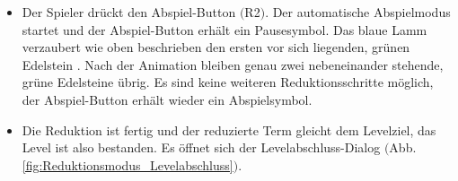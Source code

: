 \begin{itemize}
\begin{itemize}
\item Der Spieler drückt den Abspiel-Button $($R2$)$. Der automatische Abspielmodus startet und der Abspiel-Button erhält ein Pausesymbol. Das blaue Lamm verzaubert wie oben beschrieben den ersten vor sich liegenden, grünen Edelstein . Nach der Animation bleiben genau zwei nebeneinander stehende, grüne Edelsteine übrig. Es sind keine weiteren Reduktionsschritte möglich, der Abspiel-Button erhält wieder ein Abspielsymbol.
\item Die Reduktion ist fertig und der reduzierte Term gleicht dem Levelziel, das Level ist also bestanden. Es öffnet sich der Levelabschluss-Dialog $($Abb. \ref{fig:Reduktionsmodus_Levelabschluss}$)$.
\end{itemize}

\begin{figure}[H]
\centering


\end{figure}
\end{itemize}
